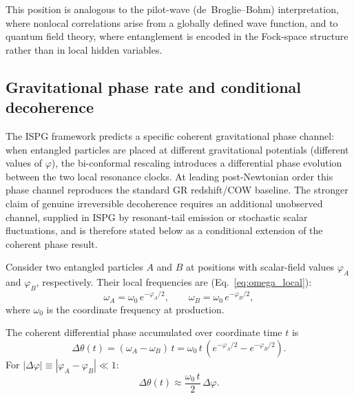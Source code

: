 \documentclass[aps,prd,onecolumn,superscriptaddress,nofootinbib,showpacs,12pt,notitlepage]{revtex4-2}
\begin{document}
This position is analogous to the pilot-wave (de~Broglie--Bohm)
interpretation, where nonlocal correlations arise from a
globally defined wave function, and to quantum field theory,
where entanglement is encoded in the Fock-space structure
rather than in local hidden variables.

\subsection{Gravitational phase rate and conditional decoherence}
\label{sec:decoherence}

The ISPG framework predicts a specific coherent gravitational
phase channel: when entangled particles are placed at different
gravitational potentials (different values of $\varphi$), the
bi-conformal rescaling introduces a differential phase evolution
between the two local resonance clocks.  At leading
post-Newtonian order this phase channel reproduces the
standard GR redshift/COW baseline.  The stronger claim of
genuine irreversible decoherence requires an additional
unobserved channel, supplied in ISPG by resonant-tail emission
or stochastic scalar fluctuations, and is therefore stated below
as a conditional extension of the coherent phase result.

Consider two entangled particles $A$ and $B$ at positions with
scalar-field values $\varphi_A$ and $\varphi_B$, respectively.
Their local frequencies are (Eq.~\ref{eq:omega_local}):
\begin{equation}
  \omega_A = \omega_0\,e^{-\varphi_A/2}, \qquad
  \omega_B = \omega_0\,e^{-\varphi_B/2},
\end{equation}
where $\omega_0$ is the coordinate frequency at production.

The coherent differential phase accumulated over coordinate time $t$ is
\begin{equation}\label{eq:diff_phase}
  \Delta\theta(t) = (\omega_A - \omega_B)\,t
  = \omega_0\,t\,
    \left(e^{-\varphi_A/2} - e^{-\varphi_B/2}\right).
\end{equation}
For $|\Delta\varphi| \equiv |\varphi_A - \varphi_B| \ll 1$:
\begin{equation}\label{eq:diff_phase_weak}
  \Delta\theta(t) \approx \frac{\omega_0\,t}{2}\,\Delta\varphi.
\end{equation}
\end{document}
